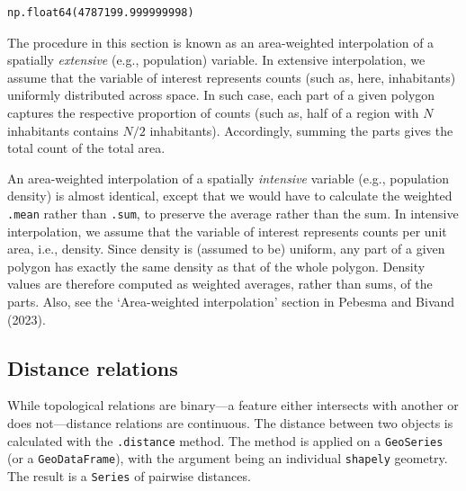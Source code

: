 \documentclass[
  letterpaper,
]{krantz}
\begin{document}
\begin{verbatim}
np.float64(4787199.999999998)
\end{verbatim}

The procedure in this section is known as an area-weighted interpolation
of a spatially \emph{extensive} (e.g., population) variable. In
extensive interpolation, we assume that the variable of interest
represents counts (such as, here, inhabitants) uniformly distributed
across space. In such case, each part of a given polygon captures the
respective proportion of counts (such as, half of a region with \(N\)
inhabitants contains \(N/2\) inhabitants). Accordingly, summing the
parts gives the total count of the total area.

An area-weighted interpolation of a spatially \emph{intensive} variable
(e.g., population density) is almost identical, except that we would
have to calculate the weighted \texttt{.mean} rather than \texttt{.sum},
to preserve the average rather than the sum. In intensive interpolation,
we assume that the variable of interest represents counts per unit area,
i.e., density. Since density is (assumed to be) uniform, any part of a
given polygon has exactly the same density as that of the whole polygon.
Density values are therefore computed as weighted averages, rather than
sums, of the parts. Also, see the `Area-weighted interpolation' section
in Pebesma and Bivand (2023).

\subsection{Distance relations}\label{sec-distance-relations}

While topological relations are binary---a feature either intersects
with another or does not---distance relations are continuous. The
distance between two objects is calculated with the \texttt{.distance}
method. The method is applied on a \texttt{GeoSeries} (or a
\texttt{GeoDataFrame}), with the argument being an individual
\texttt{shapely} geometry. The result is a \texttt{Series} of pairwise
distances.
\end{document}
